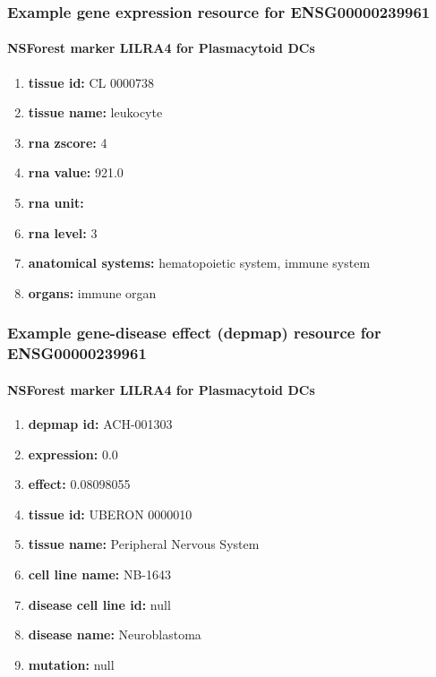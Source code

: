 \documentclass[aspectratio=169,xcolor=dvipsnames]{beamer}
\begin{document}
\begin{frame}
  \frametitle{Example \textbf{gene expression} resource for ENSG00000239961}
  \framesubtitle{NSForest marker LILRA4 for Plasmacytoid DCs}
  \begin{enumerate}\footnotesize
  \item[]\textbf{tissue id:} CL 0000738
  \item[]\textbf{tissue name:} leukocyte
  \item[]\textbf{rna zscore:} 4
  \item[]\textbf{rna value:} 921.0
  \item[]\textbf{rna unit:} 
  \item[]\textbf{rna level:} 3
  \item[]\textbf{anatomical systems:} hematopoietic system, immune system
  \item[]\textbf{organs:} immune organ
  \end{enumerate}
\end{frame}

\begin{frame}
  \frametitle{Example \textbf{gene-disease effect (depmap)} resource for ENSG00000239961}
  \framesubtitle{NSForest marker LILRA4 for Plasmacytoid DCs}
  \begin{enumerate}\footnotesize
  \item[]\textbf{depmap id:} ACH-001303
  \item[]\textbf{expression:} 0.0
  \item[]\textbf{effect:} 0.08098055
  \item[]\textbf{tissue id:} UBERON 0000010
  \item[]\textbf{tissue name:} Peripheral Nervous System
  \item[]\textbf{cell line name:} NB-1643
  \item[]\textbf{disease cell line id:} null
  \item[]\textbf{disease name:} Neuroblastoma
  \item[]\textbf{mutation:} null
  \end{enumerate}
\end{frame}
\end{document}
